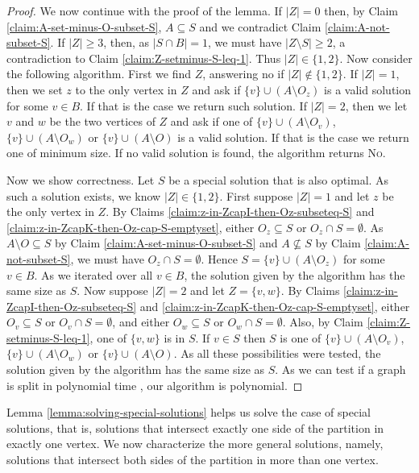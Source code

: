 \documentclass[11pt]{article}
\theoremstyle{definition}
\begin{document}
\begin{proof}
We now continue with the proof of the lemma.
If $|Z|=0$ then, by Claim \ref{claim:A-set-minus-O-subset-S}, $A \subseteq S$ and we contradict Claim \ref{claim:A-not-subset-S}.
If $|Z| \geq 3$, then, as $|S \cap B|=1$,
we must have $|Z \setminus S| \geq 2$, a contradiction to Claim \ref{claim:Z-setminus-S-leq-1}.
Thus $|Z| \in \{1,2\}$.
Now consider the following algorithm. First we find $Z$, answering no if $|Z| \notin \{1,2\}$.
If $|Z|=1$, then we set $z$ to the only vertex in $Z$
and ask if $\{v\} \cup (A \setminus O_z)$ is a valid solution for some $v \in B$. If that is the case we return such solution.
If $|Z|=2$, then we let $v$ and $w$ be the two vertices of $Z$ and ask if one of $\{v\} \cup (A \setminus O_v)$, $\{v\} \cup (A \setminus O_w)$ or $\{v\} \cup (A \setminus O)$ is a valid solution. If that is the case we return one of minimum size.
If no valid solution is found, the algorithm returns \textsc{No}.


Now we show correctness. Let $S$ be a special solution that is also optimal. As such a solution exists, we know $|Z| \in \{1,2\}$. First suppose $|Z|=1$ and let $z$ be the only vertex in $Z$. By Claims \ref{claim:z-in-ZcapI-then-Oz-subseteq-S} and \ref{claim:z-in-ZcapK-then-Oz-cap-S-emptyset}, either $O_z \subseteq S$ or $O_z \cap S = \emptyset$.
As $A \setminus O \subseteq S$ by Claim \ref{claim:A-set-minus-O-subset-S} and $A \not\subseteq S$ by Claim \ref{claim:A-not-subset-S}, we must have $O_z \cap S = \emptyset$. Hence $ S = \{v\} \cup (A \setminus O_z)$ for some $v \in B$. As we iterated over all $v \in B$, the solution given by the algorithm has the same size as $S$.
Now suppose $|Z|=2$ and let $Z=\{v,w\}$.
By Claims \ref{claim:z-in-ZcapI-then-Oz-subseteq-S} and \ref{claim:z-in-ZcapK-then-Oz-cap-S-emptyset}, either $O_v \subseteq S$ or $O_v \cap S = \emptyset$, and either $O_w \subseteq S$ or $O_w \cap S = \emptyset$.
Also, by Claim \ref{claim:Z-setminus-S-leq-1}, one of $\{v,w\}$ is in $S$.
If $v \in S$ then $S$ is one of $\{v\} \cup (A \setminus O_v)$, $\{v\} \cup (A \setminus O_w)$ or $\{v\} \cup (A \setminus O)$.
As all  these possibilities were tested,
the solution given by the algorithm has the same size as $S$.
As we can test if a graph is split in polynomial time \cite{Golumbic2004}, our algorithm is polynomial.
\end{proof}


Lemma \ref{lemma:solving-special-solutions} helps us solve the case of
special solutions, that is, solutions that intersect exactly one
side of the partition in exactly one vertex.
We now characterize the more general solutions, namely, solutions that
intersect both sides of the partition in more than one vertex.
\end{document}
